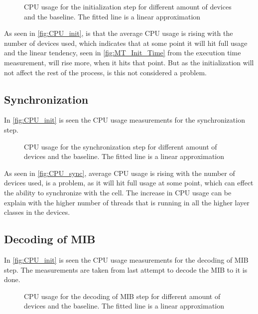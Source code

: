 \begin{figure}[H]
\centering
\resizebox{0.5\textwidth}{!}{
}
\caption{CPU usage for the initialization step for different amount of devices and the baseline. The fitted line is a linear approximation}
\label{fig:CPU_init}
\end{figure}

As seen in \autoref{fig:CPU_init}, is that the average CPU usage is rising with the number of devices used, which indicates that at some point it will hit full usage and the linear tendency, seen in \autoref{fig:MT_Init_Time} from the execution time measurement, will rise more, when it hits that point. But as the initialization will not affect the rest of the process, is this not considered a problem.

\subsection{Synchronization}
In \autoref{fig:CPU_init} is seen the CPU usage measurements for the synchronization step.

\begin{figure}[H]
\centering
\resizebox{0.5\textwidth}{!}{
}
\caption{CPU usage for the synchronization step for different amount of devices and the baseline. The fitted line is a linear approximation}
\label{fig:CPU_sync}
\end{figure}

As seen in \autoref{fig:CPU_sync}, average CPU usage is rising with the number of devices used, is a problem, as it will hit full usage at some point, which can effect the ability to synchronize with the cell. The increase in CPU usage can be explain with the higher number of threads that is running in all the higher layer classes in the devices.

\subsection{Decoding of MIB}
In \autoref{fig:CPU_init} is seen the CPU usage measurements for the decoding of MIB step. The measurements are taken from last attempt to decode the MIB to it is done.

\begin{figure}[H]
\centering
\resizebox{0.5\textwidth}{!}{
}
\caption{CPU usage for the decoding of MIB step for different amount of devices and the baseline. The fitted line is a linear approximation}
\label{fig:CPU_MIB}
\end{figure}

